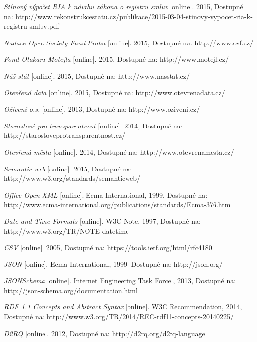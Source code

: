 \begin{thebibliography}{99}
  \emph{Stínový výpočet RIA k návrhu zákona o registru smluv} 
  [online]. 2015, Dostupné na: 
  http://www.rekonstrukcestatu.cz/publikace/2015-03-04-stinovy-vypocet-ria-k-registru-smluv.pdf

  \emph{Nadace Open Society Fund Praha} 
  [online]. 2015, Dostupné na: 
  http://www.osf.cz/  

  \emph{Fond Otakara Motejla} 
  [online]. 2015, Dostupné na: 
  http://www.motejl.cz/
  
  \emph{Náš stát} 
  [online]. 2015, Dostupné na: 
  http://www.nasstat.cz/

  \emph{Otevřená data} 
  [online]. 2015, Dostupné na: 
  http://www.otevrenadata.cz/

  \emph{Oživení o.s.} 
  [online]. 2013, Dostupné na: 
  http://www.oziveni.cz/
  
  \emph{Starostové pro transparentnost} 
  [online]. 2014, Dostupné na: 
  http://starostoveprotransparentnost.cz/
  
  \emph{Otevřená města} 
  [online]. 2014, Dostupné na: 
  http://www.otevrenamesta.cz/  
  
  \emph{Semantic web} 
  [online]. 2015, Dostupné na: 
  http://www.w3.org/standards/semanticweb/ 
 
  \emph{Office Open XML} 
  [online]. Ecma International, 1999, Dostupné na: 
  http://www.ecma-international.org/publications/standards/Ecma-376.htm

  \emph{Date and Time Formats} 
  [online]. W3C Note, 1997, Dostupné na: 
  http://www.w3.org/TR/NOTE-datetime
  
  \emph{CSV} 
  [online]. 2005, Dostupné na: 
  https://tools.ietf.org/html/rfc4180
 
  \emph{JSON} 
  [online]. Ecma International, 1999, Dostupné na: 
  http://json.org/
  
  \emph{JSONSchema} 
  [online]. Internet Engineering Task Force , 2013, Dostupné na: 
  http://json-schema.org/documentation.html   
  
  \emph{RDF 1.1 Concepts and Abstract Syntax} 
  [online]. W3C Recommendation, 2014, Dostupné na: 
  http://www.w3.org/TR/2014/REC-rdf11-concepts-20140225/
  
  \emph{D2RQ} 
  [online]. 2012, Dostupné na: 
  http://d2rq.org/d2rq-language
  

\end{thebibliography}
